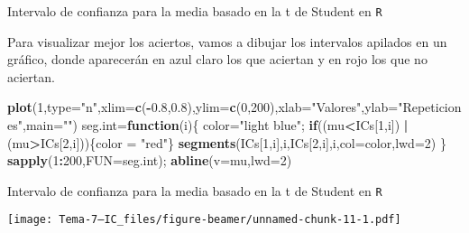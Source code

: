 \documentclass[ignorenonframetext,]{beamer}
\newenvironment{Shaded}{\begin{snugshade}}{\end{snugshade}}
\newcommand{\ControlFlowTok}[1]{\textcolor[rgb]{0.13,0.29,0.53}{\textbf{#1}}}
\newcommand{\DataTypeTok}[1]{\textcolor[rgb]{0.13,0.29,0.53}{#1}}
\newcommand{\DecValTok}[1]{\textcolor[rgb]{0.00,0.00,0.81}{#1}}
\newcommand{\FloatTok}[1]{\textcolor[rgb]{0.00,0.00,0.81}{#1}}
\newcommand{\KeywordTok}[1]{\textcolor[rgb]{0.13,0.29,0.53}{\textbf{#1}}}
\newcommand{\NormalTok}[1]{#1}
\newcommand{\OperatorTok}[1]{\textcolor[rgb]{0.81,0.36,0.00}{\textbf{#1}}}
\newcommand{\StringTok}[1]{\textcolor[rgb]{0.31,0.60,0.02}{#1}}
\begin{document}
\begin{frame}[fragile]{Intervalo de confianza para la media basado en la
t de Student en \texttt{R}}
\protect\hypertarget{intervalo-de-confianza-para-la-media-basado-en-la-t-de-student-en-r-6}{}

Para visualizar mejor los aciertos, vamos a dibujar los intervalos
apilados en un gráfico, donde aparecerán en azul claro los que aciertan
y en rojo los que no aciertan.

\begin{Shaded}
\begin{Highlighting}[]
\KeywordTok{plot}\NormalTok{(}\DecValTok{1}\NormalTok{,}\DataTypeTok{type=}\StringTok{"n"}\NormalTok{,}\DataTypeTok{xlim=}\KeywordTok{c}\NormalTok{(}\OperatorTok{-}\FloatTok{0.8}\NormalTok{,}\FloatTok{0.8}\NormalTok{),}\DataTypeTok{ylim=}\KeywordTok{c}\NormalTok{(}\DecValTok{0}\NormalTok{,}\DecValTok{200}\NormalTok{),}\DataTypeTok{xlab=}\StringTok{"Valores"}\NormalTok{,}\DataTypeTok{ylab=}\StringTok{"Repeticiones"}\NormalTok{,}\DataTypeTok{main=}\StringTok{""}\NormalTok{)}
\NormalTok{seg.int=}\ControlFlowTok{function}\NormalTok{(i)\{}
\NormalTok{  color=}\StringTok{"light blue"}\NormalTok{;}
  \ControlFlowTok{if}\NormalTok{((mu}\OperatorTok{<}\NormalTok{ICs[}\DecValTok{1}\NormalTok{,i]) }\OperatorTok{|}\StringTok{ }\NormalTok{(mu}\OperatorTok{>}\NormalTok{ICs[}\DecValTok{2}\NormalTok{,i]))\{color =}\StringTok{ "red"}\NormalTok{\}}
  \KeywordTok{segments}\NormalTok{(ICs[}\DecValTok{1}\NormalTok{,i],i,ICs[}\DecValTok{2}\NormalTok{,i],i,}\DataTypeTok{col=}\NormalTok{color,}\DataTypeTok{lwd=}\DecValTok{2}\NormalTok{)}
\NormalTok{  \}}
\KeywordTok{sapply}\NormalTok{(}\DecValTok{1}\OperatorTok{:}\DecValTok{200}\NormalTok{,}\DataTypeTok{FUN=}\NormalTok{seg.int);}
\KeywordTok{abline}\NormalTok{(}\DataTypeTok{v=}\NormalTok{mu,}\DataTypeTok{lwd=}\DecValTok{2}\NormalTok{)}
\end{Highlighting}
\end{Shaded}

\end{frame}

\begin{frame}{Intervalo de confianza para la media basado en la t de
Student en \texttt{R}}
\protect\hypertarget{intervalo-de-confianza-para-la-media-basado-en-la-t-de-student-en-r-7}{}

\texttt{[image: Tema-7---IC\_files/figure-beamer/unnamed-chunk-11-1.pdf]}

\end{frame}
\end{document}
